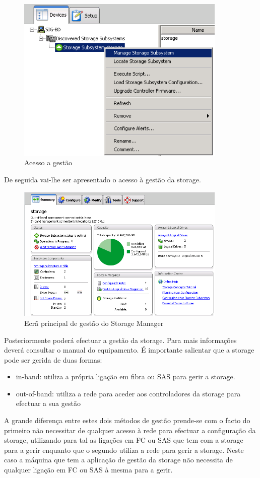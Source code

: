 \begin{figure}[H]
    \begin{center}
        \includegraphics[width=10cm]{include/img/ds3000_win_3}
    \end{center}
    \caption{Acesso a gestão}
    \label{fig:ds3000-win-2}
\end{figure}

De seguida vai-lhe ser apresentado o acesso à gestão da storage.

\begin{figure}[H]
    \begin{center}
        \includegraphics[width=10cm]{include/img/ds3000_win_4}
    \end{center}
    \caption{Ecrã principal de gestão do Storage Manager}
    \label{fig:ds3000-win-4}
\end{figure}

Posteriormente poderá efectuar a gestão da storage. Para mais informações deverá consultar o manual do equipamento.
É importante salientar que a storage pode ser gerida de duas formas:
\begin{itemize}
\item in-band: utiliza a própria ligação em fibra ou SAS para gerir a storage.
\item out-of-band: utiliza a rede para aceder aos controladores da storage para efectuar a sua gestão
\end{itemize}

A grande diferença entre estes dois métodos de gestão prende-se com o facto do primeiro não necessitar de qualquer acesso à rede para efectuar a configuração da storage, utilizando para tal as ligações em FC ou SAS que tem com a storage para a gerir enquanto que o segundo utiliza a rede para gerir a storage. Neste caso a máquina que tem a aplicação de gestão da storage não necessita de qualquer ligação em FC ou SAS à mesma para a gerir.
